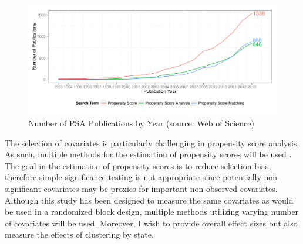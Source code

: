 \documentclass[letterpaper,12p,twoside]{article} %
\begin{document}
\begin{figure}[t]
\begin{center}
\includegraphics[width=.9\textwidth]{../Figures/PSACitations}
\caption{Number of PSA Publications by Year (source: Web of Science)}
\label{fig:PSApublications}
\end{center}
\end{figure}

The selection of covariates is particularly challenging in propensity score analysis. As such, multiple methods for the estimation of propensity scores will be used \cite{Rosenbaum2012}. The goal in the estimation of propensity scores is to reduce selection bias, therefore simple significance testing is not appropriate \cite{Rosenbaum2002,Rosenbaum2010} since potentially non-significant covariates may be proxies for important non-observed covariates. Although this study has been designed to measure the same covariates as would be used in a randomized block design, multiple methods utilizing varying number of covariates will be used. Moreover, I wish to provide overall effect sizes but also measure the effects of clustering by state. 
\end{document}
